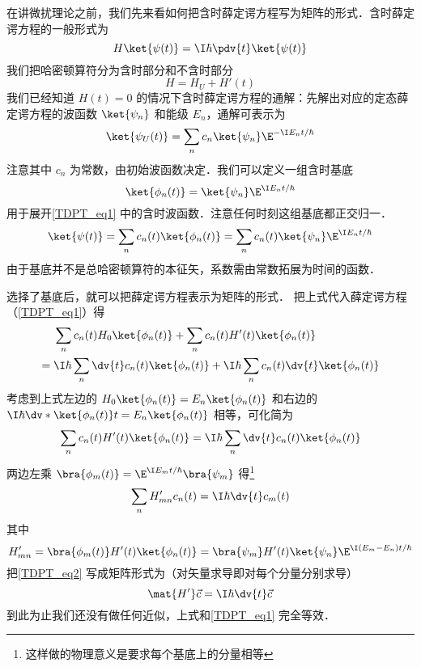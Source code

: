 
在讲微扰理论之前，我们先来看如何把含时薛定谔方程写为矩阵的形式．含时薛定谔方程的一般形式为
\begin{equation}\label{TDPT_eq1}
H \ket{\psi(t)} = \I\hbar \pdv{t} \ket{\psi(t)}
\end{equation}
我们把哈密顿算符分为含时部分和不含时部分
\begin{equation}
H = H_U + H'(t)
\end{equation}
我们已经知道 %
$H(t) = 0$ 的情况下含时薛定谔方程的通解：先解出对应的定态薛定谔方程的波函数 $\ket{\psi_n}$ 和能级 $E_n$，通解可表示为
\begin{equation}
\ket{\psi_U(t)} = \sum_n c_n \ket{\psi_n} \E^{-\I E_n t/\hbar}
\end{equation}
注意其中 $c_n$ 为常数，由初始波函数决定．我们可以定义一组含时基底
\begin{equation}
\ket{\phi_n(t)} = \ket{\psi_n} \E^{\I E_n t/\hbar}
\end{equation}
用于展开\autoref{TDPT_eq1} 中的含时波函数．注意任何时刻这组基底都正交归一．
\begin{equation}
\ket{\psi(t)} = \sum_n c_n(t) \ket{\phi_n(t)} = \sum_n c_n(t) \ket{\psi_n} \E^{\I E_n t/\hbar}
\end{equation}
由于基底并不是总哈密顿算符的本征矢，系数需由常数拓展为时间的函数．

选择了基底后，就可以把薛定谔方程表示为矩阵的形式． %
把上式代入薛定谔方程（\autoref{TDPT_eq1}）得
\begin{equation}\begin{aligned}
&\sum_n c_n(t) H_0 \ket{\phi_n(t)} + \sum_n c_n(t) H'(t) \ket{\phi_n(t)} \\ 
={} &\I\hbar \sum_n \dv{t} c_n(t) \ket{\phi_n(t)}
+ \I\hbar \sum_n c_n(t) \dv{t} \ket{\phi_n(t)}
\end{aligned}\end{equation}
考虑到上式左边的 $H_0\ket{\phi_n(t)} = E_n\ket{\phi_n(t)}$ 和右边的 $\I\hbar \dv*{\ket{\phi_n(t)}}{t} = E_n\ket{\phi_n(t)}$ 相等，可化简为
\begin{equation}
\sum_n c_n(t) H'(t) \ket{\phi_n(t)}
= \I\hbar \sum_n \dv{t} c_n(t) \ket{\phi_n(t)}
\end{equation}
两边左乘 $\bra{\phi_m(t)} = \E^{\I E_m t/\hbar}\bra{\psi_m}$ 得\footnote{这样做的物理意义是要求每个基底上的分量相等} %
\begin{equation}\label{TDPT_eq2}
\sum_n H'_{mn} c_n(t)
= \I\hbar \dv{t} c_m(t)
\end{equation}
其中
\begin{equation}\label{TDPT_eq7}
H'_{mn} = \bra{\phi_m(t)} H'(t) \ket{\phi_n(t)} = \bra{\psi_m} H'(t) \ket{\psi_n} \E^{\I(E_m-E_n)t/\hbar}
\end{equation}
把\autoref{TDPT_eq2} 写成矩阵形式为（对矢量求导即对每个分量分别求导）
\begin{equation}\label{TDPT_eq3}
\mat {H'} \vec c = \I\hbar \dv{t} \vec c
\end{equation}
到此为止我们还没有做任何近似，上式和\autoref{TDPT_eq1} 完全等效．

